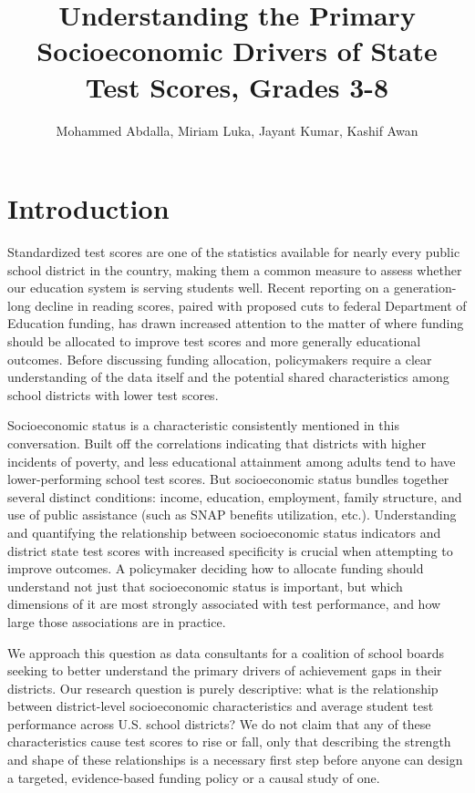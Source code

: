 \documentclass[
]{article}
\title{Understanding the Primary Socioeconomic Drivers of State Test
Scores, Grades 3-8}
\author{Mohammed Abdalla, Miriam Luka, Jayant Kumar, Kashif Awan}
\date{}
\begin{document}
\maketitle

\section{Introduction}\label{introduction}

Standardized test scores are one of the statistics available for nearly
every public school district in the country, making them a common
measure to assess whether our education system is serving students well.
Recent reporting on a generation-long decline in reading scores, paired
with proposed cuts to federal Department of Education funding, has drawn
increased attention to the matter of where funding should be allocated
to improve test scores and more generally educational outcomes. Before
discussing funding allocation, policymakers require a clear
understanding of the data itself and the potential shared
characteristics among school districts with lower test scores.

Socioeconomic status is a characteristic consistently mentioned in this
conversation. Built off the correlations indicating that districts with
higher incidents of poverty, and less educational attainment among
adults tend to have lower-performing school test scores. But
socioeconomic status bundles together several distinct conditions:
income, education, employment, family structure, and use of public
assistance (such as SNAP benefits utilization, etc.). Understanding and
quantifying the relationship between socioeconomic status indicators and
district state test scores with increased specificity is crucial when
attempting to improve outcomes. A policymaker deciding how to allocate
funding should understand not just that socioeconomic status is
important, but which dimensions of it are most strongly associated with
test performance, and how large those associations are in practice.

We approach this question as data consultants for a coalition of school
boards seeking to better understand the primary drivers of achievement
gaps in their districts. Our research question is purely descriptive:
what is the relationship between district-level socioeconomic
characteristics and average student test performance across U.S. school
districts? We do not claim that any of these characteristics cause test
scores to rise or fall, only that describing the strength and shape of
these relationships is a necessary first step before anyone can design a
targeted, evidence-based funding policy or a causal study of one.
\end{document}
